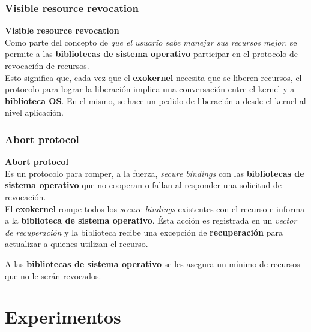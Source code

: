 \documentclass[10pt]{beamer}
\begin{document}
\subsubsection{Visible resource revocation}

\begin{frame}
\textbf{Visible resource revocation} \\[2em]

Como parte del concepto de \emph{que el usuario sabe manejar sus recursos mejor}, se permite a las \textbf{bibliotecas de sistema operativo} participar en el protocolo de revocación de recursos.\\[1em]

Esto significa que, cada vez que el \textbf{exokernel} necesita que se liberen recursos, el protocolo para lograr la liberación implica una conversación entre el kernel y a \textbf{biblioteca OS}. En el mismo, se hace un pedido de liberación a desde el kernel al nivel aplicación.

\end{frame}


\subsubsection{Abort protocol}

\begin{frame}
\textbf{Abort protocol} \\[2em]

Es un protocolo para romper, a la fuerza, \textit{secure bindings} con las \textbf{bibliotecas de sistema operativo} que no cooperan o fallan al responder una solicitud de revocación.\\[1em]

El \textbf{exokernel} rompe todos los \textit{secure bindings} existentes con el recurso e informa a la \textbf{biblioteca de sistema operativo}. Ésta acción es registrada en un \textit{vector de recuperación} y la biblioteca recibe una excepción de \textbf{recuperación} para actualizar a quienes utilizan el recurso.

A las \textbf{bibliotecas de sistema operativo} se les asegura un mínimo de recursos que no le serán revocados. 

\end{frame}


\section{Experimentos}
\end{document}
